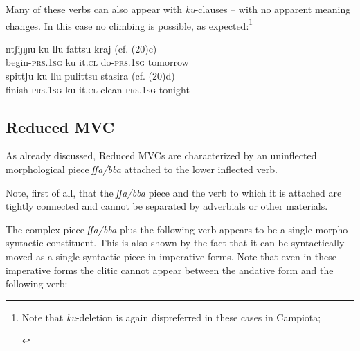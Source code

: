 \documentclass[output=paper]{langscibook}
\begin{document}
Many of these verbs can also appear with \textit{ku}-clauses -- with no apparent meaning changes. In this case no climbing is possible, as expected:\footnote{Note that \textit{ku}-deletion is again dispreferred in these cases in Campiota;

\ea \label{fn10ex}
    \z
\z
}

\ea \label{ac21}
    \ea \label{ac21a}\gll ntʃiɲɲu     ku  llu   fattsu     kraj  (cf. (20)c) \\
     begin-\textsc{prs}.\textsc{1sg}  ku  it.\textsc{cl} do-\textsc{prs}.\textsc{1sg}  tomorrow\\
    \ex \label{ac21b}\gll spittʃu      ku  llu   pulittsu     stasira (cf. (20)d) \\
     finish-\textsc{prs}.\textsc{1sg} ku it.\textsc{cl} clean-\textsc{prs}.\textsc{1sg}  tonight\\
    \z
\z


\subsection{Reduced MVC}

As already discussed, Reduced MVCs are characterized by an uninflected morphological piece \textit{ʃʃa/bba} attached to the lower inflected verb.

Note, first of all, that the \textit{ʃʃa/bba} piece and the verb to which it is attached are tightly connected and cannot be separated by adverbials or other materials.

\ea \label{ac22}
  \z
\z

The complex piece \textit{ʃʃa/bba} plus the following verb appears to be a single mor\-pho-syntactic constituent.  This is also shown by the fact that it can be syntactically moved as a single syntactic piece in imperative forms. Note that even in these imperative forms the clitic cannot appear between the andative form and the following verb:
\end{document}

